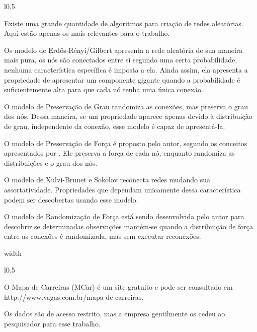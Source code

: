 \documentclass[10pt,a4paper,final]{article}
\newcommand\disappearingrule{%
  \par %
  \vskip10pt %
  \leaders\vrule width \textwidth\vskip0.4pt %
  \nointerlineskip %
  \vskip10pt %
}
\begin{document}
\begin{minipage}[t]{\linewidth}
  \begin{wrapfigure}{l}{0.5\textwidth} \label{sde:modelos-nulos}
  \end{wrapfigure}
  
  Existe uma grande quantidade de algoritmos para criação de redes aleatórias. Aqui estão apenas os mais relevantes para o trabalho.
  
  Os modelo de Erdős-Rényi/Gilbert apresenta a rede aleatória de sua maneira mais pura, os nós são conectados entre si segundo uma certa probabilidade, nenhuma característica específica é imposta a ela. Ainda assim, ela apresenta a propriedade de apresentar um componente gigante quando a probabilidade é suficientemente alta para que cada nó tenha uma única conexão.
  
  O modelo de Preservação de Grau randomiza as conexões, mas preserva o grau dos nós. Dessa maneira, se um propriedade aparece apenas devido à distribuição de grau, independente da conexão, esse modelo é capaz de apresentá-la.
  
  O modelo de Preservação de Força é proposto pelo autor, segundo os conceitos apresentados por . Ele preserva a força de cada nó, enquanto randomiza as distribuições e o grau dos nós.
  
  O modelo de Xulvi-Brunet e Sokolov reconecta redes mudando sua assortatividade. Propriedades que dependam unicamente dessa característica podem ser descobertas usando esse modelo.
  
  O modelo de Randomização de Força está sendo desenvolvida pelo autor para descobrir se determinadas observações mantém-se quando a distribuição de força entre as conexões é randomizada, mas sem executar reconexões.
\end{minipage}

\disappearingrule

\begin{minipage}[t][18\baselineskip]{\linewidth}
  \begin{wrapfigure}{l}{0.5\textwidth}
  \end{wrapfigure}
  
  O Mapa de Carreiras (MCar) é um site gratuito e pode ser consultado em http://www.vagas.com.br/mapa-de-carreiras.
  
  Os dados são de acesso restrito, mas a empresa gentilmente os cedeu ao pesquisador para esse trabalho.
\end{minipage}
\end{document}
